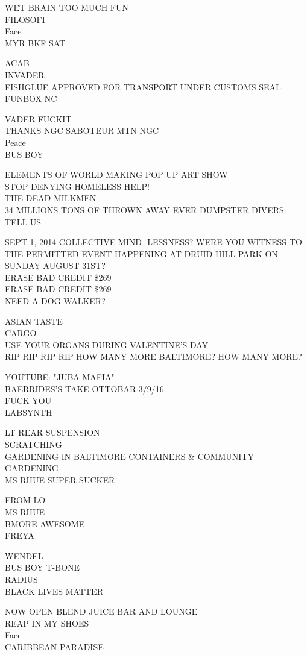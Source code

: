 \documentclass[10pt,letterpaper]{article}
\begin{document}
WET BRAIN TOO MUCH FUN\\
FILOSOFI\\
Face\\
MYR BKF SAT

ACAB\\
INVADER\\
FISHGLUE APPROVED FOR TRANSPORT UNDER CUSTOMS SEAL\\
FUNBOX NC

VADER FUCKIT\\
THANKS NGC SABOTEUR MTN NGC\\
Peace\\
BUS BOY

ELEMENTS OF WORLD MAKING POP UP ART SHOW\\
STOP DENYING HOMELESS HELP!\\
THE DEAD MILKMEN\\
34 MILLIONS TONS OF THROWN AWAY EVER DUMPSTER DIVERS: TELL US

SEPT 1, 2014 COLLECTIVE MIND{-}{-}LESSNESS?  WERE YOU WITNESS TO THE PERMITTED EVENT HAPPENING AT DRUID HILL PARK ON SUNDAY AUGUST 31ST?\\
ERASE BAD CREDIT \$269\\
ERASE BAD CREDIT \$269\\
NEED A DOG WALKER?

ASIAN TASTE\\
CARGO\\
USE YOUR ORGANS DURING VALENTINE'S DAY\\
RIP RIP RIP RIP HOW MANY MORE BALTIMORE?  HOW MANY MORE?

YOUTUBE: "JUBA MAFIA"\\
BAERRIDES'S TAKE OTTOBAR 3/9/16\\
FUCK YOU\\
LABSYNTH

LT REAR SUSPENSION\\
SCRATCHING\\
GARDENING IN BALTIMORE CONTAINERS \& COMMUNITY GARDENING\\
MS RHUE SUPER SUCKER

FROM LO\\
MS RHUE\\
BMORE AWESOME\\
FREYA

WENDEL\\
BUS BOY T{-}BONE\\
RADIUS\\
BLACK LIVES MATTER

NOW OPEN BLEND JUICE BAR AND LOUNGE\\
REAP IN MY SHOES\\
Face\\
CARIBBEAN PARADISE
\end{document}
